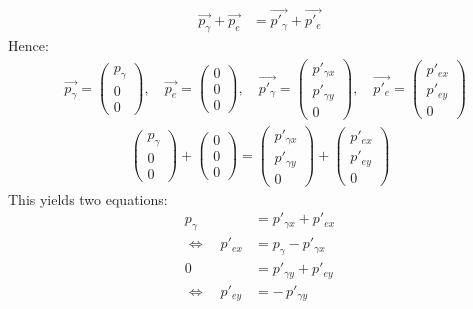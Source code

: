\begin{align*}
	\overrightarrow{p_\gamma} + \overrightarrow{p_e} &= \overrightarrow{p'_\gamma} + \overrightarrow{p'_e}
\end{align*}
Hence:
\begin{align*}
	&\overrightarrow{p_\gamma}=\begin{pmatrix}p_\gamma\\0\\0 \end{pmatrix},\quad
	\overrightarrow{p_e}=\begin{pmatrix}0 \\0\\0 \end{pmatrix},\quad
	\overrightarrow{p'_\gamma}= \begin{pmatrix}p'_{\gamma x}  \\p'_{\gamma y}\\0 \end{pmatrix},\quad
	\overrightarrow{p'_e}=  \begin{pmatrix}p'_{ex} \\p'_{ey} \\0 \end{pmatrix}
\end{align*}
\begin{align*}
	\begin{pmatrix}p_\gamma\\0\\0 \end{pmatrix} + \begin{pmatrix}0 \\0\\0 \end{pmatrix}
	= \begin{pmatrix}p'_{\gamma x} \\p'_{\gamma y}\\0 \end{pmatrix}
	+ \begin{pmatrix}p'_{ex}\\p'_{ey} \\0 \end{pmatrix}
\end{align*}
This yields two equations:
\begin{align}
	p_\gamma &= p'_{\gamma x} + p'_{ex} \nonumber\\
	\Leftrightarrow \quad
	p'_{ex} &= p_\gamma - p'_{\gamma x} \label{pex}  \\
	0 &= p'_{\gamma y} + p'_{e y} \nonumber\\
	\Leftrightarrow \quad
	p'_{ey} &= -\,p'_{\gamma y}\label{pe}
\end{align}

